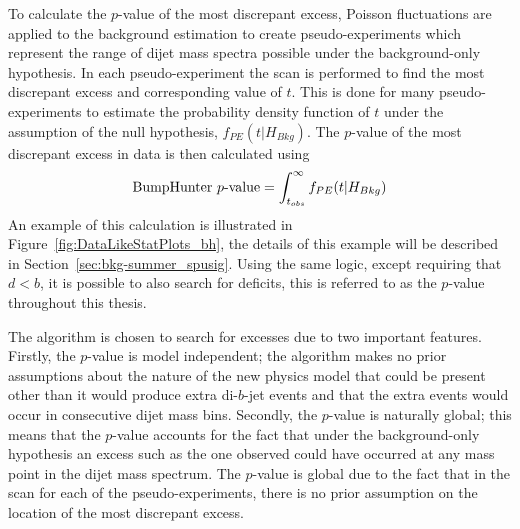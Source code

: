 To calculate the \mbox{$p$-value} of the most discrepant excess,
Poisson fluctuations are applied to the background estimation to create pseudo-experiments
which represent the range of dijet mass spectra possible under the background-only hypothesis.
In each pseudo-experiment the \bh{} scan is performed to find the most discrepant excess and corresponding value of $t$.
This is done for many pseudo-experiments to estimate the probability density function of $t$ under the assumption of the null hypothesis, $f_{PE}(t| H_{Bkg})$.
The \bh{} \mbox{$p$-value} of the most discrepant excess in data is then calculated using
\begin{equation}
  \text{BumpHunter{}}~p\text{-value} = \int_{t_{obs}}^\infty f_{PE}(t | H_{Bkg})
\end{equation}
An example of this calculation is illustrated in Figure~\ref{fig:DataLikeStatPlots_bh},
the details of this example will be described in Section~\ref{sec:bkg-summer_spusig}.
Using the same logic, except requiring that $d < b$, it is possible to also search for deficits,
this is referred to as the \dhunt{} \mbox{$p$-value} throughout this thesis.

The \bh{} algorithm is chosen to search for excesses due to two important features.
Firstly, the \bh{} \mbox{$p$-value} is model independent;
the algorithm makes no prior assumptions about the nature of the new physics model that could be present
other than it would produce extra di-$b$-jet events and that the extra events would occur in consecutive dijet mass bins.
Secondly, the \bh{} \mbox{$p$-value} is naturally global;
this means that the \mbox{$p$-value} accounts for the fact that under the background-only hypothesis
an excess such as the one observed could have occurred at any mass point in the dijet mass spectrum.
The \bh{} $p$-value is global due to the fact that in the \bh{} scan for each of the pseudo-experiments, there is no prior assumption on the location of the most discrepant excess.




